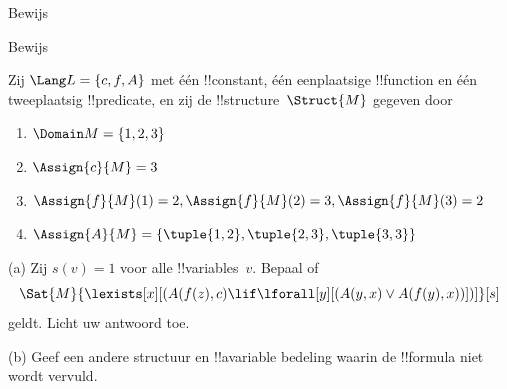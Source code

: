\documentclass[openany]{memoir}
\begin{document}

\begin{prob}
  Bewijs 
\end{prob}
\tagendprob


\begin{prob}
  Bewijs 
\end{prob}
\tagendprob

\begin{prob}
Zij $\Lang L = \{c, f, A\}$ met één !!{constant}, één eenplaatsige
!!{function} en één tweeplaatsig !!{predicate}, en zij de
!!{structure}~$\Struct{M}$ gegeven door
\begin{enumerate}
\item $\Domain M = \{1, 2, 3\}$
\item $\Assign{c}{M} = 3$
\item $\Assign{f}{M}(1) = 2, \Assign{f}{M}(2) = 3, \Assign{f}{M}(3) = 2$
\item $\Assign{A}{M} = \{\tuple{1, 2}, \tuple{2, 3}, \tuple{3, 3}\}$
\end{enumerate}
(a) Zij $s(v) = 1$ voor alle !!{variable}s~$v$. Bepaal of
\[
\Sat{M}{\lexists[x][(A(f(z), c) \lif \lforall[y][(A(y, x) \lor A(f(y),
      x))])]}[s]
\]
geldt. Licht uw antwoord toe.

(b) Geef een andere structuur en !!a{variable} bedeling waarin de
!!{formula} niet wordt vervuld.
\end{prob}
\endgroup

\begingroup
\def\olfilename{OLP-0164}
\def\olfilepath{content/first-order-logic/syntax-and-semantics/}
\hypertarget{unit-OLP-0164}{}
\end{document}
